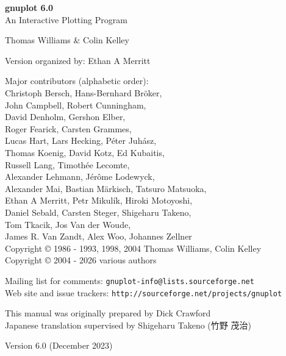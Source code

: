 \documentclass[twoside]{article}
\def\gpVersion{6.0}
\def\gnuplotVersion{\usebox\GpVersion}
\begin{document}
\sloppy
\thispagestyle{empty}
\rule{0in}{1.0in}

  \begin{center}

  {\huge\bf {gnuplot \gpVersion}}\\
  \vspace{3ex}
  {\Large An Interactive Plotting Program}\\

  \vspace{2ex}

  \large
  Thomas Williams \& Colin Kelley\\

  \vspace{2ex}

  Version
    {\gnuplotVersion }
  organized by: Ethan A Merritt\\

   \vspace{2ex}

  Major contributors (alphabetic order):\\

  Christoph Bersch,
  Hans-Bernhard Bröker,\\
  John Campbell,
  Robert Cunningham,\\
  David Denholm,
  Gershon Elber,\\
  Roger Fearick,
  Carsten Grammes,\\
  Lucas Hart,
  Lars Hecking,
  Péter Juhász,\\
  Thomas Koenig,
  David Kotz,
  Ed Kubaitis,\\
  Russell Lang,
  Timothée Lecomte,\\
  Alexander Lehmann,
  Jérôme Lodewyck,\\
  Alexander Mai,
  Bastian Märkisch,
  Tatsuro Matsuoka, \\
  Ethan A Merritt,
  Petr Mikulík,
  Hiroki Motoyoshi, \\
  Daniel Sebald,
  Carsten Steger,
  Shigeharu Takeno,\\
  Tom Tkacik,
  Jos Van der Woude,\\
  James R. Van Zandt,
  Alex Woo,
  Johannes Zellner\\
  Copyright {\copyright} 1986 - 1993, 1998, 2004   Thomas Williams, Colin Kelley\\
  Copyright {\copyright} 2004 - 2026  various authors\\

  \vspace{2ex}

  Mailing list for comments: \verb+gnuplot-info@lists.sourceforge.net+\\
  Web site and issue trackers: \verb+http://sourceforge.net/projects/gnuplot+

  \vfill
  This manual was originally prepared by Dick Crawford \\
  Japanese translation supervised by Shigeharu Takeno (竹野 茂治)

  \vspace{2ex}

   Version {\gpVersion} (December 2023)

   \end{center}
\newpage


\hypertarget{TableOfContents}{}
\tableofcontents

\newpage
\end{document}
